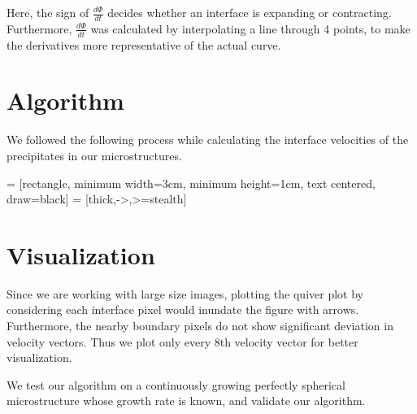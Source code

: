 \documentclass[12pt, a4paper]{report}
\begin{document}
Here, the sign of $\frac{d\Phi}{dt}$ decides whether an interface is expanding or contracting. Furthermore, $\frac{d\Phi}{dt}$ was calculated by interpolating a line through 4 points, to make the derivatives more representative of the actual curve.

\section{Algorithm}

We followed the following process while calculating the interface velocities of the precipitates in our microstructures. 

\usetikzlibrary{shapes.geometric, arrows}

 = [rectangle, minimum width=3cm, minimum height=1cm, text centered, draw=black]
 = [thick,->,>=stealth]
\begin{center}
\end{center}


\section{Visualization}
Since we are working with large size images, plotting the quiver plot by considering each interface pixel would inundate the figure with arrows. Furthermore, the nearby boundary pixels do not show significant deviation in velocity vectors. Thus we plot only every 8th velocity vector for better visualization. 

We test our algorithm on a continuously growing perfectly spherical microstructure whose growth rate is known, and validate our algorithm.
\end{document}

